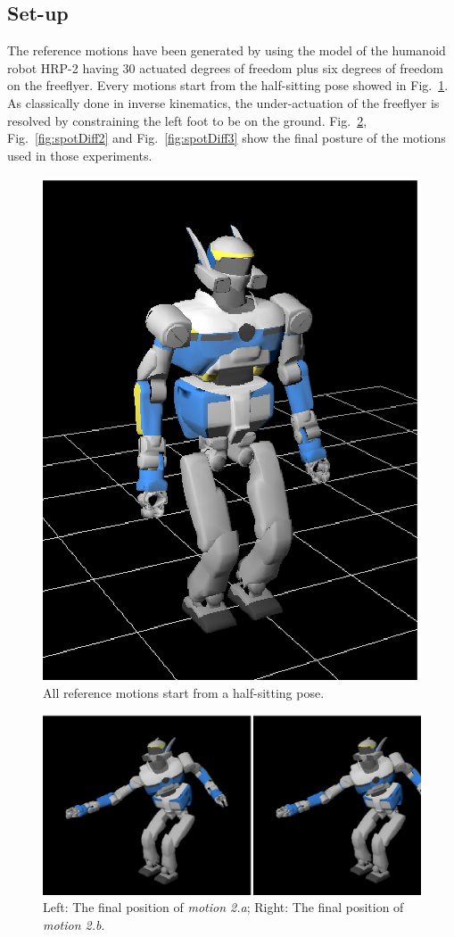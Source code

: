 \documentclass[journal]{IEEEtran}
\begin{document}
\subsection{Set-up}
The reference motions have been generated by using the model of the humanoid robot HRP-2 
having 30 actuated degrees of freedom plus six degrees of freedom on the
freeflyer. Every motions start from the half-sitting pose showed in Fig.~\ref{fig:halfSit}.
As classically done in inverse kinematics, the under-actuation of the freeflyer is resolved by constraining
the left foot to be on the ground. 
Fig.~\ref{fig:spotDiff1},
Fig.~\ref{fig:spotDiff2} and Fig.~\ref{fig:spotDiff3} show the final posture of the motions used in those
experiments.
\begin{figure}[t]
\begin{center}
\includegraphics[width=0.3\linewidth]{img/halfSit.ps}
\end{center}
\caption{All reference motions start from a half-sitting pose.}
\label{fig:halfSit}
\end{figure}
\begin{figure}[t]
  \begin{center}
    \includegraphics[width=0.9\linewidth]{img/spotDiff.ps}
  \end{center}
  \caption{Left: The final position of \emph{motion 2.a}; Right: The final position of \emph{motion 2.b}.}
  \label{fig:spotDiff1}
\end{figure}
\end{document}

